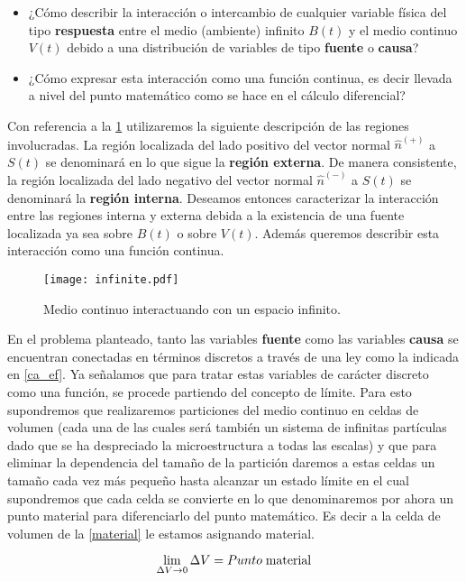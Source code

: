 \documentclass[../notas medios.tex]{subfiles}
\begin{document}
\begin{itemize}
\item ¿Cómo describir la interacción o intercambio de cualquier variable física
del tipo {\bf respuesta} entre el medio (ambiente) infinito  $B(t)$ y el medio continuo $V(t)$ debido a una distribución de variables de tipo {\bf fuente} o {\bf causa}?
\item ¿Cómo expresar esta interacción como una función continua, es decir
llevada a nivel del punto matemático como se hace en el cálculo diferencial?
\end{itemize}

Con referencia a la \cref{infinite} utilizaremos la siguiente descripción de las regiones involucradas.  La región localizada del lado positivo del vector normal ${\hat n^{( + )}}$ a $S(t)$ se denominará en lo que sigue la {\bf región externa}.  De manera consistente, la región localizada del lado negativo del vector normal ${\hat n^{( - )}}$ a $S(t)$ se denominará la {\bf región interna}.  Deseamos entonces caracterizar la interacción entre las regiones interna y externa debida a la existencia de una fuente localizada ya sea sobre $B(t)$ o sobre  $V(t)$. Además queremos describir esta interacción como una función continua.
\begin{figure}[H]
\centering
	\texttt{[image: infinite.pdf]}
	\caption{Medio continuo interactuando con un espacio infinito.}
	\label{infinite}
\end{figure}

En el problema planteado, tanto las variables {\bf fuente} como las variables
{\bf causa} se encuentran conectadas en términos discretos a través de una ley
como la indicada en \cref{ca_ef}. Ya señalamos que para tratar estas variables de carácter discreto  como una función, se procede partiendo del concepto de límite.  Para esto supondremos que realizaremos particiones del medio continuo en celdas de volumen (cada una de las cuales será también un sistema de infinitas partículas dado que se ha despreciado la microestructura a todas las escalas) y que para eliminar la dependencia del tamaño de la partición daremos a estas celdas un tamaño cada vez más pequeño hasta alcanzar un estado límite en el cual supondremos que cada celda se convierte en lo que denominaremos por ahora un punto material para diferenciarlo del punto matemático.  Es decir a la celda de volumen de la \cref{material} le estamos asignando material.

\begin{equation}
\mathop {\lim }\limits_{\Delta V \to 0} \Delta V = Punto\; {\rm{ material}}
\label{material}
\end{equation}
\end{document}
